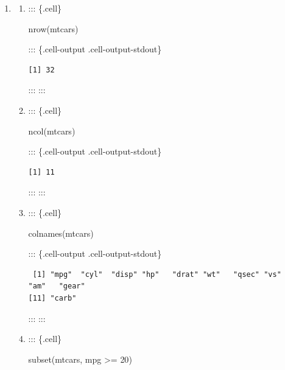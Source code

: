 \documentclass[
  letterpaper,
  DIV=11,
  numbers=noendperiod]{scrreprt}
\newenvironment{Shaded}{\begin{snugshade}}{\end{snugshade}}
\newcommand{\DecValTok}[1]{\textcolor[rgb]{0.68,0.00,0.00}{#1}}
\newcommand{\FunctionTok}[1]{\textcolor[rgb]{0.28,0.35,0.67}{#1}}
\newcommand{\NormalTok}[1]{\textcolor[rgb]{0.00,0.23,0.31}{#1}}
\newcommand{\SpecialCharTok}[1]{\textcolor[rgb]{0.37,0.37,0.37}{#1}}
\begin{document}
\begin{enumerate}
\def\labelenumi{\arabic{enumi}.}
\setcounter{enumi}{3}
\item
  \begin{enumerate}
  \def\labelenumii{\alph{enumii})}
  \item
    ::: \{.cell\}

\begin{Shaded}
\begin{Highlighting}[]
\FunctionTok{nrow}\NormalTok{(mtcars)}
\end{Highlighting}
\end{Shaded}

    ::: \{.cell-output .cell-output-stdout\}

\begin{verbatim}
[1] 32
\end{verbatim}

    ::: :::
  \item
    ::: \{.cell\}

\begin{Shaded}
\begin{Highlighting}[]
\FunctionTok{ncol}\NormalTok{(mtcars)}
\end{Highlighting}
\end{Shaded}

    ::: \{.cell-output .cell-output-stdout\}

\begin{verbatim}
[1] 11
\end{verbatim}

    ::: :::
  \item
    ::: \{.cell\}

\begin{Shaded}
\begin{Highlighting}[]
\FunctionTok{colnames}\NormalTok{(mtcars)}
\end{Highlighting}
\end{Shaded}

    ::: \{.cell-output .cell-output-stdout\}

\begin{verbatim}
 [1] "mpg"  "cyl"  "disp" "hp"   "drat" "wt"   "qsec" "vs"   "am"   "gear"
[11] "carb"
\end{verbatim}

    ::: :::
  \item
    ::: \{.cell\}

\begin{Shaded}
\begin{Highlighting}[]
\FunctionTok{subset}\NormalTok{(mtcars, mpg }\SpecialCharTok{\textgreater{}=} \DecValTok{20}\NormalTok{)}
\end{Highlighting}
\end{Shaded}


\end{enumerate}
\end{enumerate}
\end{document}
